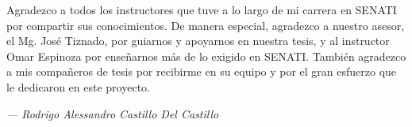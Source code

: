Agradezco a todos los instructores que tuve a lo largo de mi carrera en SENATI por compartir sus conocimientos. De manera especial, agradezco a nuestro asesor, el Mg. José Tiznado, por guiarnos y apoyarnos en nuestra tesis, y al instructor Omar Espinoza por enseñarnos más de lo exigido en SENATI. También agradezco a mis compañeros de tesis por recibirme en su equipo y por el gran esfuerzo que le dedicaron en este proyecto. 

\begin{flushright}
    \small\textit{--- Rodrigo Alessandro Castillo Del Castillo}
\end{flushright}